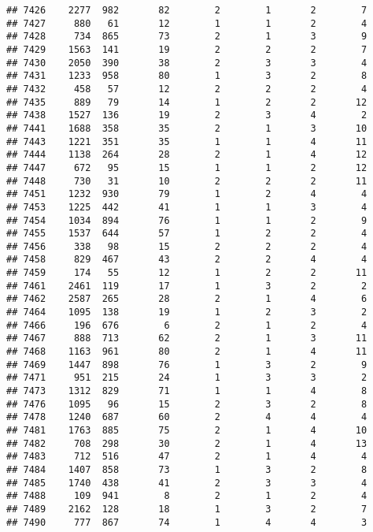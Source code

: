 \documentclass[]{article}
\begin{document}
\begin{verbatim}
## 7426    2277  982       82        2        1       2        7
## 7427     880   61       12        1        1       2        4
## 7428     734  865       73        2        1       3        9
## 7429    1563  141       19        2        2       2        7
## 7430    2050  390       38        2        3       3        4
## 7431    1233  958       80        1        3       2        8
## 7432     458   57       12        2        2       2        4
## 7435     889   79       14        1        2       2       12
## 7438    1527  136       19        2        3       4        2
## 7441    1688  358       35        2        1       3       10
## 7443    1221  351       35        1        1       4       11
## 7444    1138  264       28        2        1       4       12
## 7447     672   95       15        1        1       2       12
## 7448     730   31       10        2        2       2       11
## 7451    1232  930       79        1        2       4        4
## 7453    1225  442       41        1        1       3        4
## 7454    1034  894       76        1        1       2        9
## 7455    1537  644       57        1        2       2        4
## 7456     338   98       15        2        2       2        4
## 7458     829  467       43        2        2       4        4
## 7459     174   55       12        1        2       2       11
## 7461    2461  119       17        1        3       2        2
## 7462    2587  265       28        2        1       4        6
## 7464    1095  138       19        1        2       3        2
## 7466     196  676        6        2        1       2        4
## 7467     888  713       62        2        1       3       11
## 7468    1163  961       80        2        1       4       11
## 7469    1447  898       76        1        3       2        9
## 7471     951  215       24        1        3       3        2
## 7473    1312  829       71        1        1       4        8
## 7476    1095   96       15        2        3       2        8
## 7478    1240  687       60        2        4       4        4
## 7481    1763  885       75        2        1       4       10
## 7482     708  298       30        2        1       4       13
## 7483     712  516       47        2        1       4        4
## 7484    1407  858       73        1        3       2        8
## 7485    1740  438       41        2        3       3        4
## 7488     109  941        8        2        1       2        4
## 7489    2162  128       18        1        3       2        7
## 7490     777  867       74        1        4       4        3

\end{verbatim}
\end{document}
